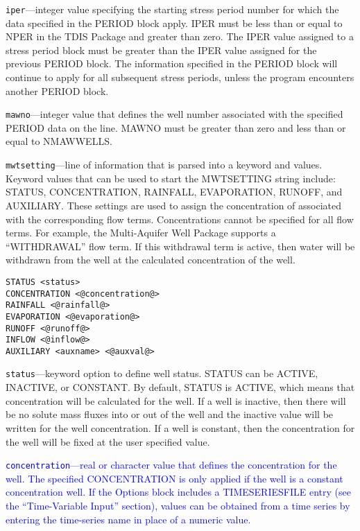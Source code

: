 \begin{description}
\item \texttt{iper}---integer value specifying the starting stress period number for which the data specified in the PERIOD block apply.  IPER must be less than or equal to NPER in the TDIS Package and greater than zero.  The IPER value assigned to a stress period block must be greater than the IPER value assigned for the previous PERIOD block.  The information specified in the PERIOD block will continue to apply for all subsequent stress periods, unless the program encounters another PERIOD block.

\item \texttt{mawno}---integer value that defines the well number associated with the specified PERIOD data on the line. MAWNO must be greater than zero and less than or equal to NMAWWELLS.

\item \texttt{mwtsetting}---line of information that is parsed into a keyword and values.  Keyword values that can be used to start the MWTSETTING string include: STATUS, CONCENTRATION, RAINFALL, EVAPORATION, RUNOFF, and AUXILIARY.  These settings are used to assign the concentration of associated with the corresponding flow terms.  Concentrations cannot be specified for all flow terms.  For example, the Multi-Aquifer Well Package supports a ``WITHDRAWAL'' flow term.  If this withdrawal term is active, then water will be withdrawn from the well at the calculated concentration of the well.

\begin{lstlisting}[style=blockdefinition]
STATUS <status>
CONCENTRATION <@concentration@>
RAINFALL <@rainfall@>
EVAPORATION <@evaporation@>
RUNOFF <@runoff@>
INFLOW <@inflow@>
AUXILIARY <auxname> <@auxval@> 
\end{lstlisting}

\item \texttt{status}---keyword option to define well status.  STATUS can be ACTIVE, INACTIVE, or CONSTANT. By default, STATUS is ACTIVE, which means that concentration will be calculated for the well.  If a well is inactive, then there will be no solute mass fluxes into or out of the well and the inactive value will be written for the well concentration.  If a well is constant, then the concentration for the well will be fixed at the user specified value.

\item \textcolor{blue}{\texttt{concentration}---real or character value that defines the concentration for the well. The specified CONCENTRATION is only applied if the well is a constant concentration well. If the Options block includes a TIMESERIESFILE entry (see the ``Time-Variable Input'' section), values can be obtained from a time series by entering the time-series name in place of a numeric value.}


\end{description}
